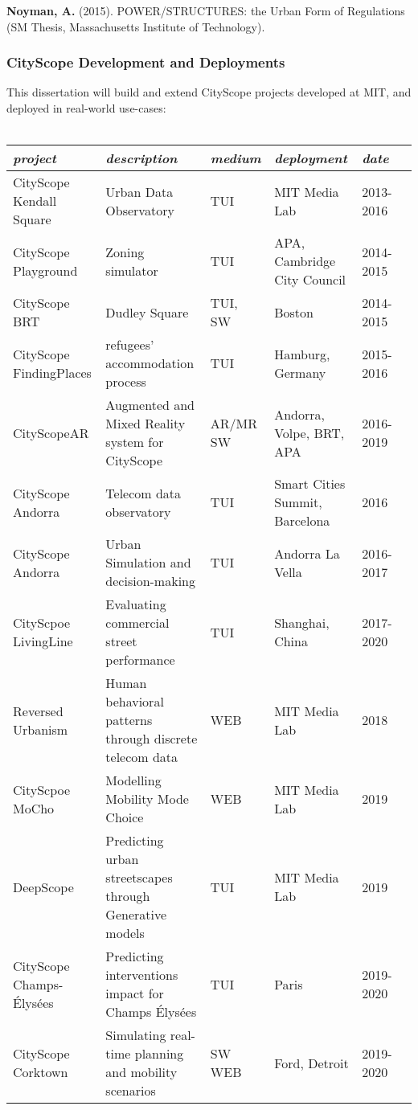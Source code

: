 {\textbf{Noyman, A.} (2015). POWER/STRUCTURES: the Urban Form of Regulations (SM Thesis, Massachusetts Institute of Technology).}
% 
\begin{sidewaystable}
\subsubsection{CityScope Development and Deployments}
{This dissertation will build and extend CityScope projects developed at MIT, and deployed in real-world use-cases:}
\\\\
\centering
\begin{adjustbox}{width=\textwidth}
\begin{tabular}{llllll}
\textit{project} & \textit{description} & \textit{medium}  &\textit{deployment} &\textit{date}  &  \\ \hline
CityScope Kendall Square & Urban Data Observatory & TUI & MIT Media Lab & 2013-2016 &  \\
CityScope Playground & Zoning simulator & TUI & APA, Cambridge City Council & 2014-2015&\\
CityScope BRT & Dudley Square & TUI, SW & Boston & 2014-2015\\
CityScope FindingPlaces & refugees’ accommodation process & TUI & Hamburg, Germany & 2015-2016\\
CityScopeAR & Augmented and Mixed Reality system for CityScope & AR/MR SW & Andorra, Volpe, BRT, APA & 2016-2019\\
CityScope Andorra & Telecom data observatory & TUI & Smart Cities Summit, Barcelona & 2016\\
CityScope Andorra & Urban Simulation and decision-making & TUI & Andorra La Vella & 2016-2017\\
CityScpoe LivingLine & Evaluating commercial street performance & TUI & Shanghai, China &  2017-2020\\
Reversed Urbanism & Human behavioral patterns through discrete telecom data & WEB & MIT Media Lab & 2018\\
CityScpoe MoCho & Modelling Mobility Mode Choice & WEB & MIT Media Lab & 2019\\
DeepScope & Predicting urban streetscapes through Generative models & TUI & MIT Media Lab & 2019\\
CityScope Champs-Élysées & Predicting interventions impact for Champs Élysées & TUI & Paris & 2019-2020\\
CityScope Corktown & Simulating real-time planning and mobility scenarios &  SW WEB & Ford, Detroit & 2019-2020\\


\end{tabular}
\end{adjustbox}
\end{sidewaystable}

